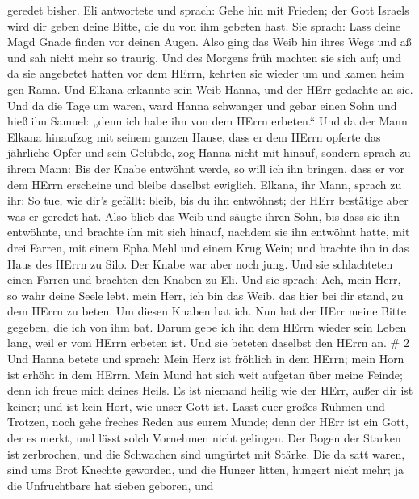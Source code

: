 geredet bisher.  Eli antwortete und sprach: Gehe hin mit
Frieden; der Gott Israels wird dir geben deine Bitte, die du von ihm
gebeten hast.  Sie sprach: Lass deine Magd Gnade finden vor
deinen Augen. Also ging das Weib hin ihres Wegs und aß und sah nicht
mehr so traurig.  Und des Morgens früh machten sie sich
auf; und da sie angebetet hatten vor dem HErrn, kehrten sie wieder um
und kamen heim gen Rama. Und Elkana erkannte sein Weib Hanna, und der
HErr gedachte an sie.  Und da die Tage um waren, ward Hanna
schwanger und gebar einen Sohn und hieß ihn Samuel: „denn ich habe ihn
von dem HErrn erbeten.``  Und da der Mann Elkana hinaufzog
mit seinem ganzen Hause, dass er dem HErrn opferte das jährliche Opfer
und sein Gelübde,  zog Hanna nicht mit hinauf, sondern
sprach zu ihrem Mann: Bis der Knabe entwöhnt werde, so will ich ihn
bringen, dass er vor dem HErrn erscheine und bleibe daselbst ewiglich.
 Elkana, ihr Mann, sprach zu ihr: So tue, wie dir's
gefällt: bleib, bis du ihn entwöhnst; der HErr bestätige aber was er
geredet hat. Also blieb das Weib und säugte ihren Sohn, bis dass sie ihn
entwöhnte,  und brachte ihn mit sich hinauf, nachdem sie
ihn entwöhnt hatte, mit drei Farren, mit einem Epha Mehl und einem Krug
Wein; und brachte ihn in das Haus des HErrn zu Silo. Der Knabe war aber
noch jung.  Und sie schlachteten einen Farren und brachten
den Knaben zu Eli.  Und sie sprach: Ach, mein Herr, so wahr
deine Seele lebt, mein Herr, ich bin das Weib, das hier bei dir stand,
zu dem HErrn zu beten.  Um diesen Knaben bat ich. Nun hat
der HErr meine Bitte gegeben, die ich von ihm bat.  Darum
gebe ich ihn dem HErrn wieder sein Leben lang, weil er vom HErrn erbeten
ist. Und sie beteten daselbst den HErrn an. \# 2  Und Hanna
betete und sprach: Mein Herz ist fröhlich in dem HErrn; mein Horn ist
erhöht in dem HErrn. Mein Mund hat sich weit aufgetan über meine Feinde;
denn ich freue mich deines Heils.  Es ist niemand heilig wie
der HErr, außer dir ist keiner; und ist kein Hort, wie unser Gott ist.
 Lasst euer großes Rühmen und Trotzen, noch gehe freches
Reden aus eurem Munde; denn der HErr ist ein Gott, der es merkt, und
lässt solch Vornehmen nicht gelingen.  Der Bogen der Starken
ist zerbrochen, und die Schwachen sind umgürtet mit Stärke. 
Die da satt waren, sind ums Brot Knechte geworden, und die Hunger
litten, hungert nicht mehr; ja die Unfruchtbare hat sieben geboren, und
